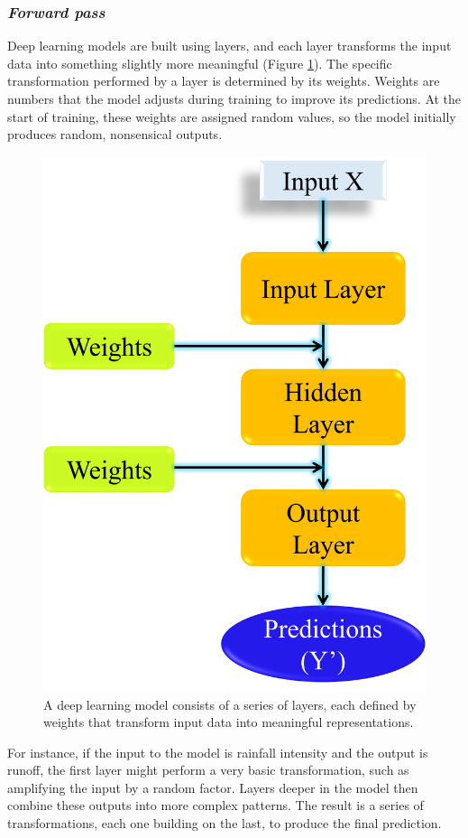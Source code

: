 \subsubsection*{\textit{Forward pass}}
Deep learning models are built using layers, and each layer transforms the input data into something slightly more meaningful (Figure \ref{fig:dl_mech1}). The specific transformation performed by a layer is determined by its weights. Weights are numbers that the model adjusts during training to improve its predictions. At the start of training, these weights are assigned random values, so the model initially produces random, nonsensical outputs.


\begin{figure}[h]
    \includegraphics[width=0.4\linewidth]{images/dl_mechanism1.png}
    \caption{A deep learning model consists of a series of layers, each defined by weights that transform input data into meaningful representations.}
    \label{fig:dl_mech1}
\end{figure}
For instance, if the input to the model is rainfall intensity and the output is runoff, the first layer might perform a very basic transformation, such as amplifying the input by a random factor. Layers deeper in the model then combine these outputs into more complex patterns. The result is a series of transformations, each one building on the last, to produce the final prediction.


